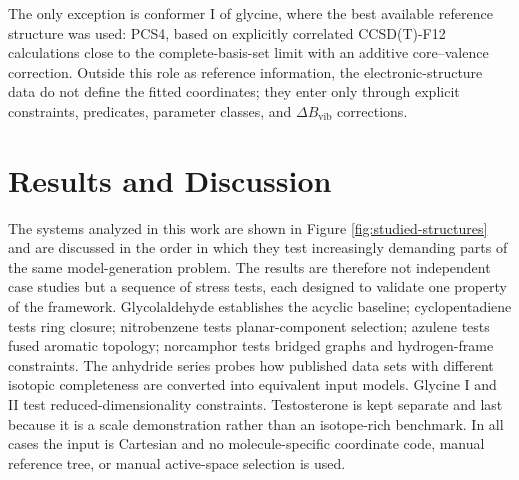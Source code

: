 \documentclass[aip,jcp,reprint,longbibliography,floatfix]{revtex4-2}
\begin{document}
The only exception is conformer I of glycine, where the best available reference structure was used: PCS4, based on explicitly correlated CCSD(T)-F12 calculations close to the complete-basis-set limit with an additive core--valence correction. Outside this role as reference information, the electronic-structure
data do not define the fitted coordinates; they enter only through explicit
constraints, predicates, parameter classes, and $\Delta B_\mathrm{vib}$
corrections.


\section{Results and Discussion}

The systems analyzed in this work are shown in Figure \ref{fig:studied-structures}
and are discussed in the order in which  they test increasingly demanding parts of
the same model-generation problem. The results are therefore not independent
case studies but a sequence of stress tests, each designed to validate one
property of the framework. Glycolaldehyde establishes the acyclic baseline;
cyclopentadiene tests ring closure; nitrobenzene tests planar-component
selection; azulene tests fused aromatic topology; norcamphor tests bridged
graphs and hydrogen-frame constraints. The anhydride series probes how
published data sets with different isotopic completeness are converted into
equivalent input models. Glycine I and II test reduced-dimensionality
constraints. Testosterone is kept separate and last because it is a scale
demonstration rather than an isotope-rich benchmark. In all cases the input is
Cartesian and no molecule-specific coordinate code, manual reference tree, or
manual active-space selection is used.
\end{document}

